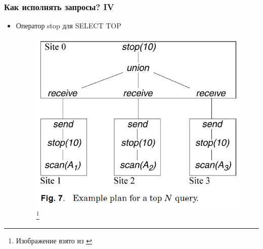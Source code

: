 \documentclass{beamer}
\begin{document}
\begin{frame}
\frametitle{Как исполнять запросы? IV}

\begin{itemize}
  \setlength\itemsep{1em}

  \item Оператор stop для SELECT TOP

    \begin{figure}[htb]
\includegraphics[width=\textwidth,height=0.75\textheight,keepaspectratio]{kossman-6.png} 
\footnote{\tiny{Изображение взято из \cite{Kossmann2000}}}
 \end{figure}    

\end{itemize}

\end{frame}
\end{document}
